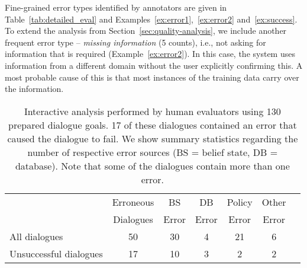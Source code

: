 \documentclass[11pt]{article}
\newcommand{\exampleref}[1]{Example~\ref{#1}}
\begin{document}
Fine-grained error types identified by annotators are given in Table~\ref{tab:detailed_eval} and Examples~\ref{ex:error1},~\ref{ex:error2} and~\ref{ex:success}.
To extend the analysis from Section~\ref{sec:quality-analysis}, we include another frequent error type -- \emph{missing information} (5 counts), i.e., not asking for information that is required (\exampleref{ex:error2}). In this case, the system uses information from a different domain without the user explicitly confirming this.
A most probable cause of this is that most instances of the training data carry over the information.


\begin{table*}[t]
    \centering\small
    \begin{tabular}{lc|ccccc}
      \toprule
      & Erroneous & BS & DB & Policy & Other \\
      & Dialogues  & Error & Error & Error & Error \\
      \midrule
      All dialogues & 50  & 30 & 4 & 21 & 6 \\
      Unsuccessful dialogues & 17 & 10 & 3 & 2 & 2 \\ 

      \bottomrule
    \end{tabular}
    \caption{Interactive  analysis performed by human evaluators using 130 prepared dialogue goals. 17 of these dialogues contained an error that caused the dialogue to fail. We show summary statistics regarding the number of respective error sources (BS = belief state, DB = database).
    Note that some of the dialogues contain more than one error.}
    \label{tab:interact_eval}
\end{table*}
\end{document}
